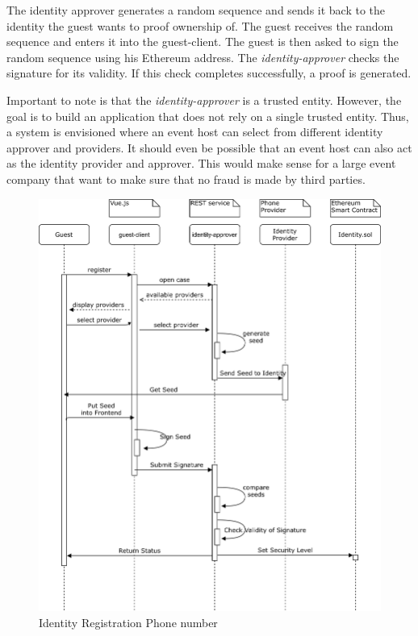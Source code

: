 The identity approver generates a random sequence and sends it back to the identity the guest wants to proof ownership of. The guest receives the random sequence and enters it into the guest-client. The guest is then asked to sign the random sequence using his Ethereum address. The \textit{identity-approver} checks the signature for its validity. If this check completes successfully, a proof is generated.

Important to note is that the \textit{identity-approver} is a trusted entity. However, the goal is to build an application that does not rely on a single trusted entity. Thus, a system is envisioned where an event host can select from different identity approver and providers. It should even be possible that an event host can also act as the identity provider and approver. This would make sense for a large event company that want to make sure that no fraud is made by third parties. 

\begin{figure}[H]
    \centering
    \includegraphics[width=16cm]{design/diagrams/identy-registration-airbnb.png}
    \caption{Identity Registration Phone number}
    \label{fig:identity-registration-airbnb}
\end{figure}

